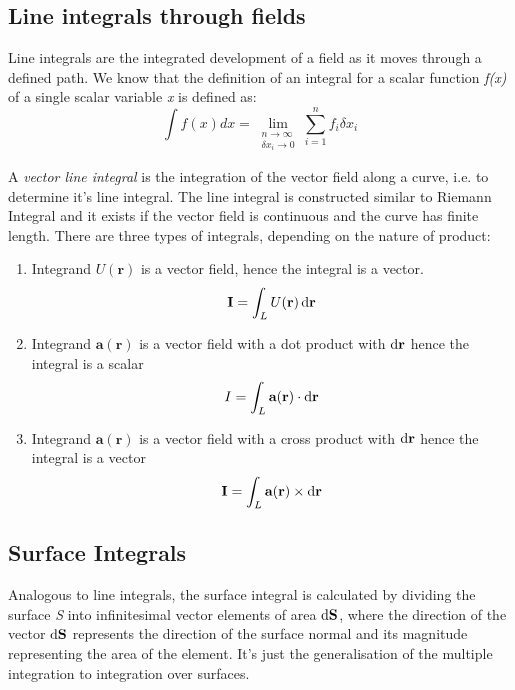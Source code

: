 \subsection{Line integrals through fields}
Line integrals are the integrated development of a field as it moves through a defined path. We know that the definition of an integral for a scalar function \textit{f(x)} of a single scalar variable \textit{x} is defined as:
\begin{equation}
	\int f(x)dx = \lim_{\substack{n \rightarrow \infty \\ \delta x_{i} \rightarrow 0} } \sum_{i=1}^{n} f_{i} \delta x_{i}
\end{equation}

A \textit{vector line integral} is the integration of the vector field along a curve, i.e. to determine it's line integral. The line integral is constructed similar to Riemann Integral and it exists if the vector field is continuous and the curve has finite length. There are three types of integrals, depending on the nature of product:

\begin{enumerate}
	\item Integrand $ U(\textbf{r}) $ is a vector field, hence the integral is a vector. 
	\begin{equation}
		\textbf{I} = \int_{L} U(\textbf{r}) \mathop{}\!\mathrm{d}\textbf{r}
	\end{equation}
	\item Integrand $\textbf{a}(\textbf{r})$ is a vector field with a dot product with $\mathop{}\!\mathrm{d} \textbf{r}$ hence the integral is a scalar
	\begin{equation}
		I = \int_{L} \textbf{a}(\textbf{r})\cdot \mathop{}\!\mathrm{d}\textbf{r}
	\end{equation}
	\item Integrand $\textbf{a}(\textbf{r})$ is a vector field with a cross product with $\mathop{}\!\mathrm{d} \textbf{r}$ hence the integral is a vector
	\begin{equation}
		\textbf{I} = \int_{L} \textbf{a}(\textbf{r})\times \mathop{}\!\mathrm{d}\textbf{r}
	\end{equation}
	
\end{enumerate}

\subsection{Surface Integrals}
Analogous to line integrals, the surface integral is calculated by dividing the surface \textit{S} into infinitesimal vector elements of area $ \mathop{}\!\mathrm{d} \textbf{S}$, where the direction of the vector $ \mathop{}\!\mathrm{d} \textbf{S} $ represents the direction of the surface normal and its magnitude representing the area of the element. It's just the generalisation of the multiple integration to integration over surfaces. 

